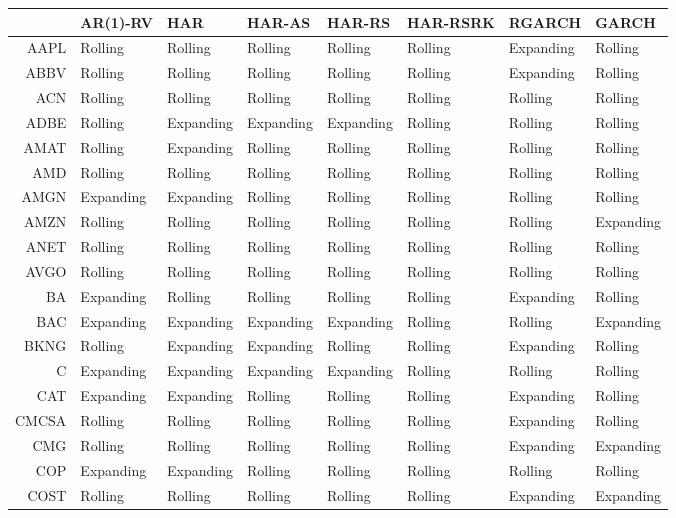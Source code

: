 \begin{table}[ht]
\centering
\begin{tabular}{rlllllll}
  \hline
 & AR(1)-RV & HAR & HAR-AS & HAR-RS & HAR-RSRK & RGARCH & GARCH \\ 
  \hline
AAPL & Rolling & Rolling & Rolling & Rolling & Rolling & Expanding & Rolling \\ 
  ABBV & Rolling & Rolling & Rolling & Rolling & Rolling & Expanding & Rolling \\ 
  ACN & Rolling & Rolling & Rolling & Rolling & Rolling & Rolling & Rolling \\ 
  ADBE & Rolling & Expanding & Expanding & Expanding & Rolling & Rolling & Rolling \\ 
  AMAT & Rolling & Expanding & Rolling & Rolling & Rolling & Rolling & Rolling \\ 
  AMD & Rolling & Rolling & Rolling & Rolling & Rolling & Rolling & Rolling \\ 
  AMGN & Expanding & Expanding & Rolling & Rolling & Rolling & Rolling & Rolling \\ 
  AMZN & Rolling & Rolling & Rolling & Rolling & Rolling & Rolling & Expanding \\ 
  ANET & Rolling & Rolling & Rolling & Rolling & Rolling & Rolling & Rolling \\ 
  AVGO & Rolling & Rolling & Rolling & Rolling & Rolling & Rolling & Rolling \\ 
  BA & Expanding & Rolling & Rolling & Rolling & Rolling & Expanding & Rolling \\ 
  BAC & Expanding & Expanding & Expanding & Expanding & Rolling & Rolling & Expanding \\ 
  BKNG & Rolling & Expanding & Expanding & Rolling & Rolling & Expanding & Rolling \\ 
  C & Expanding & Expanding & Expanding & Expanding & Rolling & Rolling & Rolling \\ 
  CAT & Expanding & Expanding & Rolling & Rolling & Rolling & Expanding & Rolling \\ 
  CMCSA & Rolling & Rolling & Rolling & Rolling & Rolling & Expanding & Rolling \\ 
  CMG & Rolling & Rolling & Rolling & Rolling & Rolling & Expanding & Expanding \\ 
  COP & Expanding & Expanding & Rolling & Rolling & Rolling & Rolling & Rolling \\ 
  COST & Rolling & Rolling & Rolling & Rolling & Rolling & Expanding & Expanding \\ 

\end{tabular}
\end{table}
